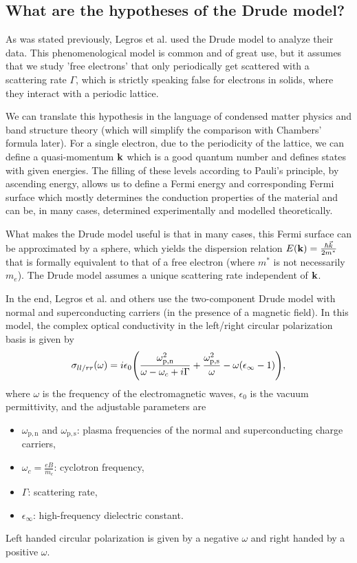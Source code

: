 \subsection{What are the hypotheses of the Drude model?}
As was stated previously, Legros et al. used the Drude model to analyze their data. 
This phenomenological model is common and of great use, but it assumes that we study 'free electrons' that only periodically get scattered with a scattering rate $\Gamma$, 
which is strictly speaking false for electrons in solids, 
where they interact with a periodic lattice.

We can translate this hypothesis in the language of condensed matter physics and band structure theory (which will simplify the comparison with Chambers' formula later). 
For a single electron, due to the periodicity of the lattice, 
we can define a quasi-momentum $\vb{k}$ which is a good quantum number and defines states with given energies. 
The filling of these levels according to Pauli's principle, by ascending energy, 
allows us to define a Fermi energy and corresponding Fermi surface 
which mostly determines the conduction properties of the material and can be, 
in many cases, determined experimentally and modelled theoretically.

What makes the Drude model useful is that in many cases, 
this Fermi surface can be approximated by a sphere, which yields the dispersion relation
$E(\vb{k}) = \frac{\hbar\vec{k}}{2m^*}$  that is formally equivalent to that of a free electron
(where $m^*$ is not necessarily $m_e$). The Drude model assumes a unique scattering rate
independent of $\vb{k}$.

In the end, Legros et al.\cite{legros2022} and others\cite{post2021} use the two-component Drude model with normal and superconducting carriers (in the presence of a magnetic field). 
In this model, the complex optical conductivity in the left/right circular polarization basis is given by
\begin{equation}
    \sigma_{ll/rr}(\omega) = i\epsilon_0\qty(
        \frac{\omega^2_{\mathrm{p,n}}}{\omega-\omega_c+i\Gamma}
        + \frac{\omega^2_{\mathrm{p,s}}}{\omega} - \omega(\epsilon_{\infty} - 1)),
\end{equation}
where $\omega$ is the frequency of the electromagnetic waves, $\epsilon_0$ is the vacuum
permittivity, and the adjustable parameters are
\begin{itemize}
    \item $\omega_{\mathrm{p,n}}$ and $\omega_{\mathrm{p,s}}$: plasma frequencies of the normal and
        superconducting charge carriers,
    \item $\omega_c = \frac{eB}{m_c}$: cyclotron frequency,
    \item $\Gamma$: scattering rate,
    \item $\epsilon_{\infty}$: high-frequency dielectric constant.
\end{itemize}
Left handed circular polarization is given by a negative $\omega$ and right handed by a positive $\omega$.

